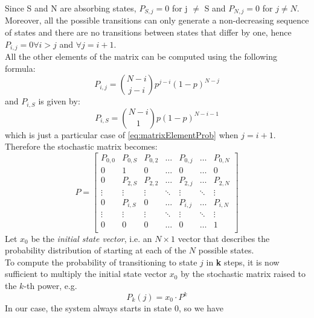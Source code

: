 Since S and N are absorbing states, $P_{S,j}=0$ for j $\neq$ S and $P_{N,j} = 0$
for $j \neq N$.\\
Moreover, all the possible transitions can only generate a non-decreasing
sequence of states and there are no transitions between states that differ by
one, hence $P_{i, j} = 0 \forall i > j$ and $\forall j = i + 1$.\\
All the other elements of the matrix can be computed using the following formula:
\begin{equation}
    P_{i,j} = {N-i\choose j - i} p^{j - i} (1-p)^{N - j}
    \label{eq:matrixElementProb}
\end{equation}
and $P_{i,S}$ is given by:
\begin{equation}
    P_{i,S} = {N-i\choose 1} p(1-p)^{N - i - 1}
    \label{eq:matrixProbToS}
\end{equation}
which is just a particular case of \eqref{eq:matrixElementProb} when $j = i + 1$.\\
Therefore the stochastic matrix becomes:
\begin{equation*}
P = 
\begin{bmatrix}
P_{0,0}	& P_{0,S}	& P_{0,2}	& \dots  	& P_{0,j}	& \dots		& P_{0,N} \\
0		& 1			& 0			& \dots  	& 0			& \dots		& 0		 \\
0		& P_{2,S}	& P_{2,2}	& \dots  	& P_{2,j}	& \dots		& P_{2,N} \\
\vdots	& \vdots	& \vdots	& \ddots 	& \vdots	& \ddots	& \vdots \\
0		& P_{i,S}	& 0			& \dots		& P_{i,j}	& \dots		& P_{i,N} \\
\vdots	& \vdots	& \vdots	& \ddots	& \vdots	& \ddots	& \vdots \\
0		& 0			& 0			& \dots  	& 0			& \dots		& 1		 \\
\end{bmatrix}
\label{stochasticMatrix2}
\end{equation*}
Let $x_{0}$ be the \textit{initial state vector}, i.e. an $N \times 1$ vector
that describes the probability distribution of starting at each of the $N$
possible states.\\
To compute the probability of transitioning to state $j$ in \textbf{k} steps, it
is now sufficient to multiply the initial state vector $x_{0}$ by the stochastic
matrix raised to the $k$-th power, e.g.
\begin{equation}\label{probAtStateK1}
P_{k}(j) = x_{0}\cdot P^{k}
\end{equation}
In our case, the system always starts in state 0, so we have
